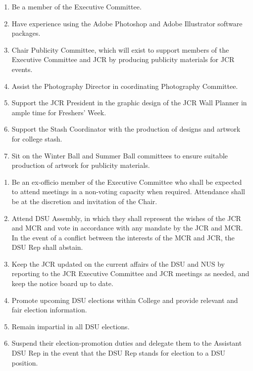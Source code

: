 \begin{enumerate}
    \item Be a member of the Executive Committee.
    \item Have experience using the Adobe Photoshop and Adobe Illustrator software packages.
    \item Chair Publicity Committee, which will exist to support members of the Executive Committee and JCR by producing publicity materials for JCR events.
    \item Assist the Photography Director in coordinating Photography Committee.
    \item Support the JCR President in the graphic design of the JCR Wall Planner in ample time for Freshers’ Week.
    \item Support the Stash Coordinator with the production of designs and artwork for college stash.
    \item Sit on the Winter Ball and Summer Ball committees to ensure suitable production of artwork for publicity materials.
\end{enumerate}



\label{sc: DSU Rep}
\begin{enumerate}
    \item Be an ex-officio member of the Executive Committee who shall be expected to attend meetings in a non-voting capacity when required. Attendance shall be at the discretion and invitation of the Chair. 
    \item Attend DSU Assembly, in which they shall represent the wishes of the JCR and MCR and vote in accordance with any mandate by the JCR and MCR. In the event of a conflict between the interests of the MCR and JCR, the DSU Rep shall abstain.
    \item Keep the JCR updated on the current affairs of the DSU and NUS by reporting to the JCR Executive Committee and JCR meetings as needed, and keep the notice board up to date.
    \item Promote upcoming DSU elections within College and provide relevant and fair election information.
    \item Remain impartial in all DSU elections.
    \item Suspend their election-promotion duties and delegate them to the Assistant DSU Rep in the event that the DSU Rep stands for election to a DSU position.
\end{enumerate}

